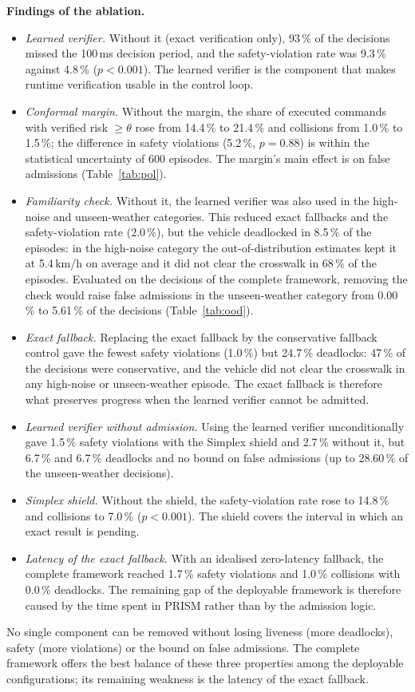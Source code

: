 \documentclass[11pt]{article}
\begin{document}
\textbf{Findings of the ablation.}
\begin{itemize}[leftmargin=1.3em,itemsep=2pt]
\item \emph{Learned verifier.} Without it (exact verification only), 93\,\% of the decisions missed the 100\,ms decision period, and the safety-violation rate was 9.3\,\% against 4.8\,\% ($p<0.001$). The learned verifier is the component that makes runtime verification usable in the control loop.
\item \emph{Conformal margin.} Without the margin, the share of executed commands with verified risk $\ge\theta$ rose from 14.4\,\% to 21.4\,\% and collisions from 1.0\,\% to 1.5\,\%; the difference in safety violations (5.2\,\%, $p=0.88$) is within the statistical uncertainty of 600 episodes. The margin's main effect is on false admissions (Table~\ref{tab:pol}).
\item \emph{Familiarity check.} Without it, the learned verifier was also used in the high-noise and unseen-weather categories. This reduced exact fallbacks and the safety-violation rate (2.0\,\%), but the vehicle deadlocked in 8.5\,\% of the episodes: in the high-noise category the out-of-distribution estimates kept it at 5.4\,km/h on average and it did not clear the crosswalk in 68\,\% of the episodes. Evaluated on the decisions of the complete framework, removing the check would raise false admissions in the unseen-weather category from 0.00\,\% to 5.61\,\% of the decisions (Table~\ref{tab:ood}).
\item \emph{Exact fallback.} Replacing the exact fallback by the conservative fallback control gave the fewest safety violations (1.0\,\%) but 24.7\,\% deadlocks: 47\,\% of the decisions were conservative, and the vehicle did not clear the crosswalk in any high-noise or unseen-weather episode. The exact fallback is therefore what preserves progress when the learned verifier cannot be admitted.
\item \emph{Learned verifier without admission.} Using the learned verifier unconditionally gave 1.5\,\% safety violations with the Simplex shield and 2.7\,\% without it, but 6.7\,\% and 6.7\,\% deadlocks and no bound on false admissions (up to 28.60\,\% of the unseen-weather decisions).
\item \emph{Simplex shield.} Without the shield, the safety-violation rate rose to 14.8\,\% and collisions to 7.0\,\% ($p<0.001$). The shield covers the interval in which an exact result is pending.
\item \emph{Latency of the exact fallback.} With an idealised zero-latency fallback, the complete framework reached 1.7\,\% safety violations and 1.0\,\% collisions with 0.0\,\% deadlocks. The remaining gap of the deployable framework is therefore caused by the time spent in PRISM rather than by the admission logic.
\end{itemize}
No single component can be removed without losing liveness (more deadlocks), safety (more violations) or the bound on false admissions. The complete framework offers the best balance of these three properties among the deployable configurations; its remaining weakness is the latency of the exact fallback.
\end{document}

